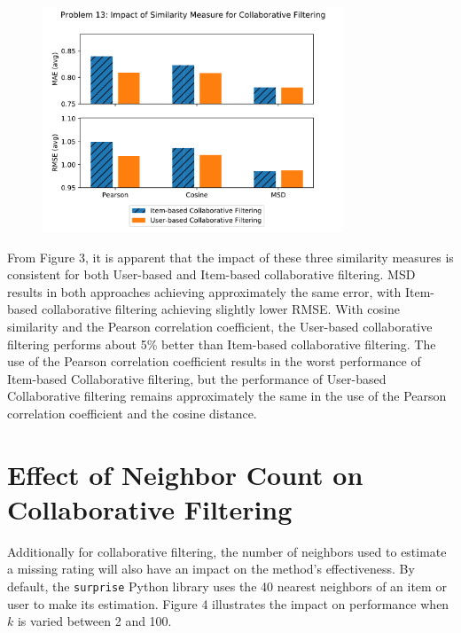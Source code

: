 \documentclass[11pt]{article}
\begin{document}
\begin{figure}[h!] \label{fig:something}
  \centering
  \includegraphics[width=0.8\textwidth]{sim_comp}
  \caption{}
\end{figure}

From Figure 3, it is apparent that the impact of these three similarity measures is consistent for both User-based and Item-based collaborative filtering.
MSD results in both approaches achieving approximately the same error, with Item-based collaborative filtering achieving slightly lower RMSE.
With cosine similarity and the Pearson correlation coefficient, the User-based collaborative filtering performs about 5\% better than Item-based collaborative filtering.
The use of the Pearson correlation coefficient results in the worst performance of Item-based Collaborative filtering, but the performance of User-based Collaborative filtering remains approximately the same in the use of the Pearson correlation coefficient and the cosine distance.


\section{Effect of Neighbor Count on Collaborative Filtering}

Additionally for collaborative filtering, the number of neighbors used to estimate a missing rating will also have an impact on the method's effectiveness.
By default, the \texttt{surprise} Python library uses the 40 nearest neighbors of an item or user to make its estimation.
Figure 4 illustrates the impact on performance when $k$ is varied between 2 and 100.
\end{document}
